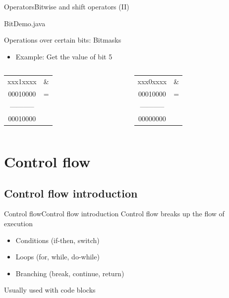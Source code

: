 \documentclass[10pt,compress]{beamer} %
\begin{document}
\begin{frame}{Operators}{Bitwise and shift operators (II)}
		\vspace{-0.2cm}
	\begin{block}{BitDemo.java}
		\vspace{-0.2cm}
		
		\vspace{-0.2cm}
	\end{block}

	Operations over certain bits: Bitmasks
	\begin{itemize}
	\item Example: Get the value of bit 5
	\end{itemize}

    \begin{columns}
		\footnotesize{
		\begin{tabular}{cc}
		xxx1xxxx & \& \\
		00010000 & =  \\
		----------- &    \\
		00010000 &    \\
		\end{tabular}
		}
		\footnotesize{
		\begin{tabular}{cc}
		xxx0xxxx & \&  \\
		00010000 & =   \\
		----------- &     \\
		00000000 &     \\
		\end{tabular}
		}
	\end{columns}
\end{frame}

\section{Control flow}
\subsection{Control flow introduction}
\begin{frame}{Control flow}{Control flow introduction}
	Control flow breaks up the flow of execution
	\begin{itemize}
	\item Conditions (if-then, switch)
	\item Loops (for, while, do-while)
	\item Branching (break, continue, return)
	\end{itemize}
    Usually used with code blocks
\end{frame}
\end{document}

